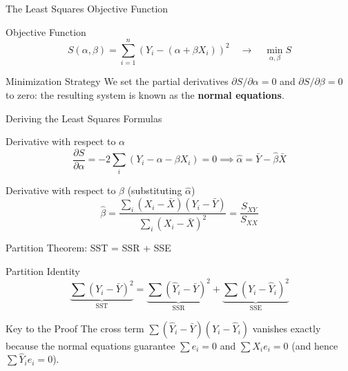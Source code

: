 \documentclass[10pt, aspectratio=169]{beamer}
\begin{document}
\begin{frame}{The Least Squares Objective Function}
  \footnotesize
  \begin{block}{Objective Function}
    $$S(\alpha,\beta) = \sum_{i=1}^n\left(Y_i-(\alpha+\beta X_i)\right)^2 \quad \longrightarrow \quad \min_{\alpha,\beta} S$$
  \end{block}
  \pause

  \vspace{0.1cm}
  \begin{alertblock}{Minimization Strategy}
    We set the partial derivatives $\partial S/\partial\alpha=0$ and $\partial S/\partial\beta=0$ to zero: the resulting system is known as the \textbf{normal equations}.
  \end{alertblock}
\end{frame}

\begin{frame}{Deriving the Least Squares Formulas}
  \footnotesize
  \begin{block}{Derivative with respect to $\alpha$}
    $$\frac{\partial S}{\partial\alpha}=-2\sum_i(Y_i-\alpha-\beta X_i)=0 \implies \hat\alpha=\bar Y-\hat\beta\bar X$$
  \end{block}
  \pause

  \vspace{0.1cm}
  \begin{alertblock}{Derivative with respect to $\beta$ (substituting $\hat\alpha$)}
    $$\hat\beta=\frac{\sum_i(X_i-\bar X)(Y_i-\bar Y)}{\sum_i(X_i-\bar X)^2}=\frac{S_{XY}}{S_{XX}}$$
  \end{alertblock}
\end{frame}

\begin{frame}{Partition Theorem: SST = SSR + SSE}
  \footnotesize
  \begin{block}{Partition Identity}
    $$\underbrace{\sum(Y_i-\bar Y)^2}_{\text{SST}} = \underbrace{\sum(\hat Y_i-\bar Y)^2}_{\text{SSR}} + \underbrace{\sum(Y_i-\hat Y_i)^2}_{\text{SSE}}$$
  \end{block}
  \pause

  \vspace{0.1cm}
  \begin{alertblock}{Key to the Proof}
    The cross term $\sum(\hat Y_i-\bar Y)(Y_i-\hat Y_i)$ vanishes exactly because the normal equations guarantee $\sum e_i=0$ and $\sum X_ie_i=0$ (and hence $\sum\hat Y_ie_i=0$).
  \end{alertblock}
\end{frame}
\end{document}
